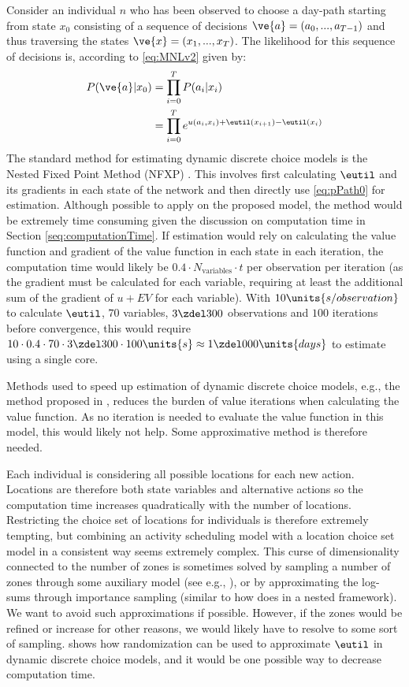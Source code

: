 Consider an individual $n$ who has been observed to choose a day-path starting from state $x_0$ consisting of a sequence of decisions  $\ve{a} = (a_0,...,a_{T-1})$ and thus traversing the states $\ve{x} = (x_1,...,x_{T})$. The likelihood for this sequence of decisions is, according to \eqref{eq:MNLv2} given by:
 \begin{equation}\label{eq:pPath0}
 \begin{aligned}
 P(\ve{a}|x_0) & = \prod_{i=0}^{T}P(a_i|x_i) \\
 & = \prod_{i=0}^{T} e^{u(a_i,x_i) + \eutil(x_{i+1})-\eutil(x_i)}
 \end{aligned}
 \end{equation}
The standard method for estimating dynamic discrete choice models is the Nested Fixed Point Method (NFXP) \citep{RustML88}. This involves first calculating $\eutil$ and its gradients in each state of the network and then directly use \eqref{eq:pPath0} for estimation. Although possible to apply on the proposed model, the method would be extremely time consuming given the discussion on computation time in Section \ref{seq:computationTime}. If estimation would rely on calculating the value function and gradient of the value function in each state in each iteration, the computation time would likely be $0.4\cdot N_{\text{variables}} \cdot t$ per observation per iteration (as the gradient must be calculated for each variable, requiring at least the additional sum of the gradient of $u + EV$ for each variable). With $10\units{s/observation}$ to calculate $\eutil$, $70$ variables, $3\zdel 300$ observations and $100$ iterations before convergence, this would require $10 \cdot 0.4 \cdot  70 \cdot 3\zdel 300 \cdot 100 \units{s} \approx 1\zdel 000 \units{days}$ to estimate using a single core. 

Methods used to speed up estimation of dynamic discrete choice models, e.g., the method proposed in \citet{aguirregabiria2002swapping}, reduces the burden of value iterations when calculating the value function. As no iteration is needed to evaluate the value function in this model, this would likely not help. Some approximative method is therefore needed.

Each individual is considering all possible locations for each new action. Locations are therefore both state variables and alternative actions so the computation time increases quadratically with the number of locations. Restricting the choice set of locations for individuals is therefore extremely tempting, but combining an activity scheduling model with a location choice set model in a consistent way seems extremely complex. This curse of dimensionality connected to the number of zones is sometimes solved by sampling a number of zones through some auxiliary model (see e.g., \citep{liao13}), or by approximating the log-sums through importance sampling (similar to how \citealt{Bradley10} does in a nested framework). We want to avoid such approximations if possible. However, if the zones would be refined or increase for other reasons, we would likely have to resolve to some sort of sampling. \citet{Rust97} shows how randomization can be used to approximate $\eutil$ in dynamic discrete choice models, and it would be one possible way to decrease computation time.

